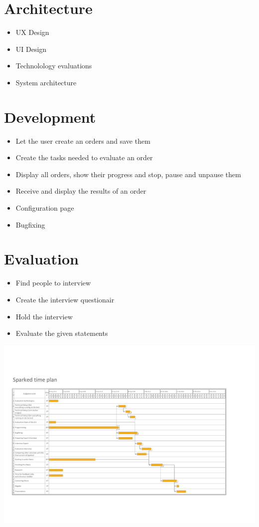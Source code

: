\documentclass[12pt,a4paper,titlepage,oneside,BCOR1cm]{scrreprt}
\begin{document}
\section{Architecture}
\begin{itemize}
  \item UX Design
  \item UI Design
  \item Technolology evaluations
  \item System architecture
\end{itemize}  

\section{Development}
\begin{itemize}
  \item Let the user create an orders and save them
  \item Create the tasks needed to evaluate an order
  \item Display all orders, show their progress and stop, pause and unpause them
  \item Receive and display the results of an order
  \item Configuration page
  \item Bugfixing
\end{itemize}
\section{Evaluation}
  \begin{itemize}
    \item Find people to interview
    \item Create the interview questionair
    \item Hold the interview
    \item Evaluate the given statements
  \end{itemize}

\hspace*{-1.5in}
\includegraphics[width=\paperwidth]{gantt-proposal-2.pdf}
\end{document}
